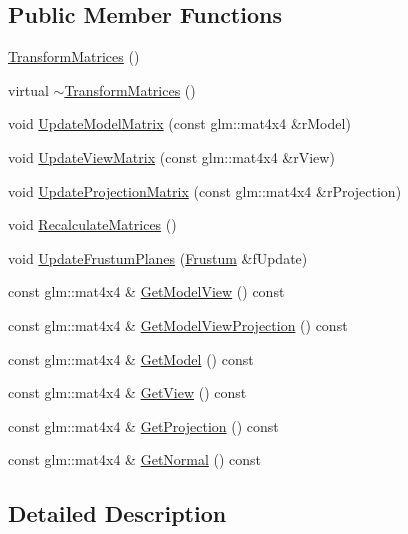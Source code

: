 \subsection*{Public Member Functions}
\begin{DoxyCompactItemize}
\item 
\hyperlink{class_transform_matrices_a0fe4bcd8ebb2965671ab265f769dca7b}{Transform\+Matrices} ()
\item 
virtual \hyperlink{class_transform_matrices_a83975d6fdc09f240497e262ed208268d}{$\sim$\+Transform\+Matrices} ()
\item 
void \hyperlink{class_transform_matrices_ae789d8a6dbedad4e7c5e5d20cd2ba7eb}{Update\+Model\+Matrix} (const glm\+::mat4x4 \&r\+Model)
\item 
void \hyperlink{class_transform_matrices_aa0ae6f910f3789ff6c5cf6aec12fff1c}{Update\+View\+Matrix} (const glm\+::mat4x4 \&r\+View)
\item 
void \hyperlink{class_transform_matrices_ab648e15eebd1103c820bcc138d0fad7a}{Update\+Projection\+Matrix} (const glm\+::mat4x4 \&r\+Projection)
\item 
void \hyperlink{class_transform_matrices_a545cb824ebfc3859dece48f849691f2c}{Recalculate\+Matrices} ()
\item 
void \hyperlink{class_transform_matrices_a95cc3a34ba489bcc50edc45b287d616e}{Update\+Frustum\+Planes} (\hyperlink{class_frustum}{Frustum} \&f\+Update)
\item 
const glm\+::mat4x4 \& \hyperlink{class_transform_matrices_aa147639c7d5c776a4a728870f75c8258}{Get\+Model\+View} () const 
\item 
const glm\+::mat4x4 \& \hyperlink{class_transform_matrices_a7424cdd77cd8bb2048a2d5ddf98f096a}{Get\+Model\+View\+Projection} () const 
\item 
const glm\+::mat4x4 \& \hyperlink{class_transform_matrices_a27e562193dec9cd9def6e81684663db1}{Get\+Model} () const 
\item 
const glm\+::mat4x4 \& \hyperlink{class_transform_matrices_ad5467bd96bc08a862a140bd2be652790}{Get\+View} () const 
\item 
const glm\+::mat4x4 \& \hyperlink{class_transform_matrices_aaa727e925e369d84406847dc6c9bc278}{Get\+Projection} () const 
\item 
const glm\+::mat4x4 \& \hyperlink{class_transform_matrices_a9a80838d0d2ac0d51054dedceb3a757b}{Get\+Normal} () const 
\end{DoxyCompactItemize}


\subsection{Detailed Description}


